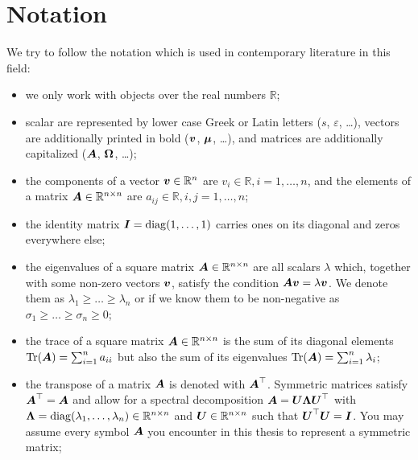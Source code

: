 \chapter*{Notation}
\label{chp:0-notation}

We try to follow the notation which is used in contemporary literature in this field:

\begin{itemize}
    \item we only work with objects over the real numbers $\mathbb{R}$;
    \item scalar are represented by lower case Greek or Latin letters ($s$, $\varepsilon$, \dots),
          vectors are additionally printed in bold ($\boldsymbol{v}$, $\boldsymbol{\mu}$, \dots),
          and matrices are additionally capitalized ($\boldsymbol{A}$, $\boldsymbol{\Omega}$, \dots);
    \item the components of a vector $\boldsymbol{v} \in \mathbb{R}^{n}$ are $v_i \in \mathbb{R}, i = 1, \dots, n$,
          and the elements of a matrix $\boldsymbol{A} \in \mathbb{R}^{n \times n}$ are $a_{ij} \in \mathbb{R}, i, j = 1, \dots, n$;
    \item the identity matrix $\boldsymbol{I} = \operatorname{diag}(1, \dots, 1)$ carries ones on its
          diagonal and zeros everywhere else;
    \item the eigenvalues of a square matrix $\boldsymbol{A} \in \mathbb{R}^{n \times n}$
          are all scalars $\lambda$ which, together with some non-zero vectors
          $\boldsymbol{v}$, satisfy the condition $\boldsymbol{A} \boldsymbol{v} = \lambda \boldsymbol{v}$.
          We denote them as $\lambda_1 \geq \dots \geq \lambda_n$ or if we know
          them to be non-negative as $\sigma_1 \geq \dots \geq \sigma_n \geq 0$;
    \item the trace of a square matrix $\boldsymbol{A} \in \mathbb{R}^{n \times n}$ is
          the sum of its diagonal elements $\operatorname{Tr}(\boldsymbol{A}) = \sum_{i=1}^n a_{ii}$
          but also the sum of its eigenvalues $\operatorname{Tr}(\boldsymbol{A}) = \sum_{i=1}^n \lambda_i$;
    \item the transpose of a matrix $\boldsymbol{A}$ is denoted with $\boldsymbol{A}^{\top}$.
          Symmetric matrices satisfy $\boldsymbol{A}^{\top} = \boldsymbol{A}$ and
          allow for a spectral decomposition $\boldsymbol{A} = \boldsymbol{U} \boldsymbol{\Lambda} \boldsymbol{U}^{\top}$
          with $\boldsymbol{\Lambda} = \operatorname{diag}(\lambda_1, \dots, \lambda_n) \in \mathbb{R}^{n \times n}$ and 
          $\boldsymbol{U} \in \mathbb{R}^{n \times n}$ such that $\boldsymbol{U}^{\top} \boldsymbol{U} = \boldsymbol{I}$.
          You may assume every symbol $\boldsymbol{A}$ you encounter in this thesis to
          represent a symmetric matrix;

\end{itemize}
